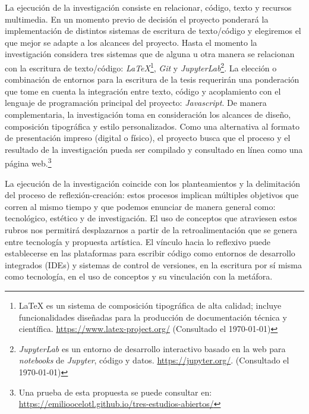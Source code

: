 La ejecución de la investigación consiste en relacionar, código, texto y recursos multimedia. En un momento previo de decisión el proyecto ponderará la implementación de distintos sistemas de escritura de texto/código y elegiremos el que mejor se adapte a los alcances del proyecto. Hasta el momento la investigación considera tres sistemas que de alguna u otra manera se relacionan con la escritura de texto/código: \textit{LaTeX}\footnote{LaTeX es un sistema de composición tipográfica de alta calidad; incluye funcionalidades diseñadas para la producción de documentación técnica y científica. \url{https://www.latex-project.org/} (Consultado el \today)}, \textit{Git} y \textit{JupyterLab}\footnote{\textit{JupyterLab} es un entorno de desarrollo interactivo basado en la web para \textit{notebooks} de \textit{Jupyter}, código y datos. \url{https://jupyter.org/}. (Consultado el \today)}. La elección o combinación de entornos para la escritura de la tesis requerirán una ponderación que tome en cuenta la integración entre texto, código y acoplamiento con el lenguaje de programación principal del proyecto: \textit{Javascript}. De manera complementaria, la investigación toma en consideración los alcances de diseño, composición tipográfica y estilo personalizados. Como una alternativa al formato de presentación impreso (digital o físico), el proyecto busca que el proceso y el resultado de la investigación pueda ser compilado y consultado en línea como una página web.\footnote{Una prueba de esta propuesta se puede consultar en: \url{https://emilioocelotl.github.io/tres-estudios-abiertos/}}

La ejecución de la investigación coincide con los planteamientos y la delimitación del proceso de reflexión-creación: estos procesos implican múltiples objetivos que corren al mismo tiempo y que podemos enunciar de manera general como: tecnológico, estético y de investigación. El uso de conceptos que atraviesen estos rubros nos permitirá desplazarnos a partir de la retroalimentación que se genera entre tecnología y propuesta artística. El vínculo hacia lo reflexivo puede establecerse en las plataformas para escribir código como entornos de desarrollo integrados (IDEs) y sistemas de control de versiones, en la escritura por sí misma como tecnología, en el uso de conceptos y su vinculación con la metáfora. 



